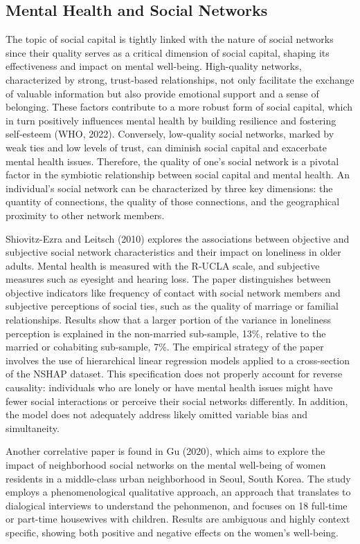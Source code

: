 \subsection{Mental Health and Social Networks}
    The topic of social capital is tightly linked with the nature of social networks since their quality serves as a critical dimension of social capital, shaping its effectiveness and impact on mental well-being. High-quality networks, characterized by strong, trust-based relationships, not only facilitate the exchange of valuable information but also provide emotional support and a sense of belonging. These factors contribute to a more robust form of social capital, which in turn positively influences mental health by building resilience and fostering self-esteem (WHO, 2022). Conversely, low-quality social networks, marked by weak ties and low levels of trust, can diminish social capital and exacerbate mental health issues. Therefore, the quality of one's social network is a pivotal factor in the symbiotic relationship between social capital and mental health.
    An individual's social network can be characterized by three key dimensions: the quantity of connections, the quality of those connections, and the geographical proximity to other network members. 
        

    Shiovitz-Ezra and Leitsch (2010) explores the associations between objective and subjective social network characteristics and their impact on loneliness in older adults. Mental health is measured with the R-UCLA scale, and subjective measures such as eyesight and hearing loss. The paper distinguishes between objective indicators like frequency of contact with social network members and subjective perceptions of social ties, such as the quality of marriage or familial relationships. Results show that a larger portion of the variance in loneliness perception is explained in the non-married sub-sample, 13\%, relative to the married or cohabiting sub-sample, 7\%.
    The empirical strategy of the paper involves the use of hierarchical linear regression models applied to a cross-section of the NSHAP dataset. This specification does not properly account for reverse causality:  individuals who are lonely or have mental health issues might have fewer social interactions or perceive their social networks differently. In addition, the model does not adequately address likely omitted variable bias and simultaneity.

    Another correlative paper is found in Gu (2020), which aims to explore the impact of neighborhood social networks on the mental well-being of women residents in a middle-class urban neighborhood in Seoul, South Korea. The study employs a phenomenological qualitative approach, an approach that translates to dialogical interviews to understand the pehonmenon, and focuses on 18 full-time or part-time housewives with children. Results are ambiguous and highly context specific, showing both positive and negative effects on the women's well-being.

